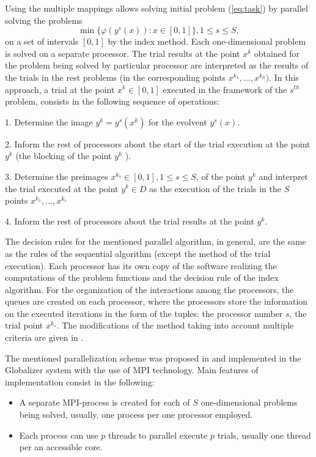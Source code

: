 \documentclass{svproc}
\begin{document}
Using the multiple mappings allows solving initial problem (\ref{eq:task}) by parallel solving the
problems
\[
\min\{\varphi(y^s(x)):x\in [0,1]\}, 1\leq s\leq S,
\]
on a set of intervals $[0,1]$ by the index method. Each one-dimensional problem is solved on a
separate processor. The trial results at the point \(x^k\) obtained for the problem being solved by
particular processor are interpreted as the results of the trials in the rest problems (in the
corresponding points \(x^{k_1},\dots,x^{k_S})\). In this approach, a trial at the point \(x^k \in
[0,1]\) executed in the framework of the \(s^{th}\) problem, consists in the following sequence
of
operations:
\par
1. Determine the image \(y^k=y^s (x^k)\) for the evolvent \(y^s (x)\).
\par
2. Inform the rest of processors about the start of the trial execution at the point \( y^k\) (the
blocking of the point \(y^k\) ).
\par
3. Determine the preimages \(x{}^{k_s}  \in [0,1], 1\leq s\leq S\), of the point \(y^k\) and
interpret the
trial executed at the point \(y^k \in D \) as the execution of the trials in the \(S\) points
\(x{}^{k_1} ,\dots,x{}^{k_s} \)
\par
4. Inform the rest of processors about the trial results at the point \(y^k\).
\par
The decision rules for the mentioned parallel algorithm, in general, are the same as the rules of the
sequential algorithm (except the method of the trial execution). Each processor has its own copy
of the software realizing the computations of the problem functions and the decision rule of the
index algorithm. For the organization of the interactions among the processors, the queues are
created on each processor, where the processors store the information on the executed iterations
in the form of the tuples: the processor number \(s\), the trial point \(x{}^{k_s}\).
The modifications of the method taking into account multiple criteria are given in \cite{GERGEL2017,Gergel2018}.
\par
The mentioned parallelization scheme was proposed in \cite{Gergel2009} and implemented in the
Globalizer system with the use of MPI technology. Main
features of implementation consist in the following:
\begin{itemize}
  \item A separate MPI-process is created for each
 of \(S\) one-dimensional problems being solved, usually, one process per one processor
 employed.
 \item Each process can use $p$ threads to parallel execute $p$ trials, usually one thread per an
accessible core.
\end{itemize}
\end{document}
